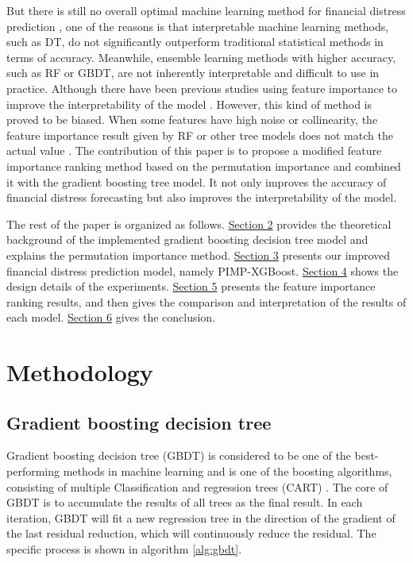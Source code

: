 \documentclass[review]{elsarticle}
\begin{document}
But there is still no overall optimal machine learning method for financial distress prediction \citep{Alaka2018}, one of the reasons is that interpretable machine learning methods, such as DT, do not significantly outperform traditional statistical methods in terms of accuracy. Meanwhile, ensemble learning methods with higher accuracy, such as RF or GBDT, are not inherently interpretable and difficult to use in practice. Although there have been previous studies using feature importance to improve the interpretability of the model \citep{Huang2004, Son2019, Wyrobek2019, Xia2017}. However, this kind of method is proved to be biased. When some features have high noise or collinearity, the feature importance result given by RF or other tree models does not match the actual value \citep{Altmann2010}. The contribution of this paper is to propose a modified feature importance ranking method based on the permutation importance and combined it with the gradient boosting tree model. It not only improves the accuracy of financial distress forecasting but also improves the interpretability of the model.

The rest of the paper is organized as follows. \hyperref[section_2]{Section 2} provides the theoretical background of the implemented gradient boosting decision tree model and explains the permutation importance method. \hyperref[section_3]{Section 3} presents our improved financial distress prediction model, namely PIMP-XGBoost. \hyperref[section_4]{Section 4} shows the design details of the experiments. \hyperref[section_5]{Section 5} presents the feature importance ranking results, and then gives the comparison and interpretation of the results of each model. \hyperref[section_6]{Section 6} gives the conclusion.


\section{Methodology}
\label{section_2}
\subsection{Gradient boosting decision tree}
Gradient boosting decision tree (GBDT) is considered to be one of the best-performing methods in machine learning and is one of the boosting algorithms, consisting of multiple Classification and regression trees (CART) \citep{Friedman2001}. The core of GBDT is to accumulate the results of all trees as the final result. In each iteration, GBDT will fit a new regression tree in the direction of the gradient of the last residual reduction, which will continuously reduce the residual. The specific process is shown in algorithm \ref{alg:gbdt}.
\end{document}

